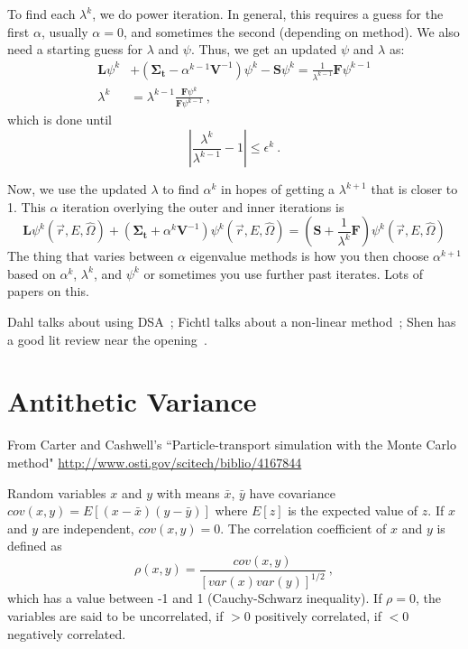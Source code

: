 \documentclass[12pt,twoside]{article}
\newcommand{\vOmega}{\ensuremath{\hat{\Omega}}}
\newcommand{\ve}[1]{\ensuremath{\mathbf{#1}}}
\begin{document}
To find each $\lambda^k$, we do power iteration. 
In general, this requires a guess for the first $\alpha$, usually $\alpha=0$, and sometimes the second (depending on method). 
We also need a starting guess for $\lambda$ and $\psi$. Thus, we get an updated $\psi$ and $\lambda$ as:
\begin{align*}
\ve{L} \psi^k &+ (\ve{\Sigma_t} - \alpha^{k-1} \ve{V}^{-1}) \psi^k -\ve{S}\psi^k = \frac{1}{\lambda^{k-1}} \ve{F} \psi^{k-1}\\
\lambda^k &= \lambda^{k-1}\frac{\ve{F} \psi^k}{\ve{F} \psi^{k-1}}\:,
\end{align*}
which is done until 
\[
|\frac{\lambda^k}{\lambda^{k-1}} - 1 | \leq \epsilon^k\:.
\]

Now, we use the updated $\lambda$ to find $\alpha^k$ in hopes of getting a $\lambda^{k+1}$ that is closer to 1. 
This $\alpha$ iteration overlying the outer and inner iterations is
\[
\ve{L} \psi^k(\vec{r}, E, \vOmega) + (\ve{\Sigma_t} + \alpha^k \ve{V}^{-1}) \psi^k(\vec{r}, E, \vOmega) = (\ve{S} + \frac{1}{\lambda^k}\ve{F}) \psi^k(\vec{r}, E, \vOmega)
\]
The thing that varies between $\alpha$ eigenvalue methods is how you then choose $\alpha^{k+1}$ based on $\alpha^k$, $\lambda^k$, and $\psi^k$ or sometimes you use further past iterates. 
Lots of  papers on this.

Dahl talks about using DSA~\cite{Dahl2006}; Fichtl talks about a non-linear method~\cite{Fichtl}; Shen has a good lit review near the opening~\cite{Shen2015}.


\section*{Antithetic Variance}
From Carter and Cashwell's ``Particle-transport simulation with the Monte Carlo method" \href{http://www.osti.gov/scitech/biblio/4167844}{http://www.osti.gov/scitech/biblio/4167844}

Random variables $x$ and $y$ with means $\bar{x}$, $\bar{y}$ have covariance $cov(x,y) = E[(x - \bar{x})(y - \bar{y})]$ where $E[z]$ is the expected value of $z$. 
If $x$ and $y$ are independent, $cov(x,y)=0$.
The correlation coefficient of $x$ and $y$ is defined as
\[
\rho(x,y) = \frac{cov(x,y)}{[var(x)var(y)]^{1/2}}\:,
\]
which has a value between -1 and 1 (Cauchy-Schwarz inequality).
If $\rho=0$, the variables are said to be uncorrelated, if $>0$ positively correlated, if $<0$ negatively correlated.
\end{document}
